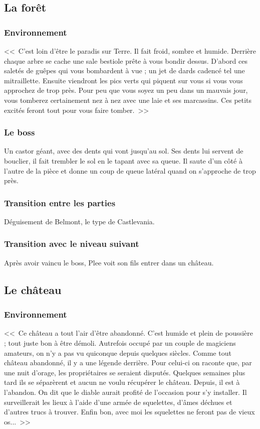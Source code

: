 \documentclass{article}
\begin{document}
\subsection{La forêt}
\subsubsection{Environnement}
<<~C'est loin d'être le paradis sur Terre. Il fait froid, sombre et
humide. Derrière chaque arbre se cache une sale bestiole prête à vous
bondir dessus. D'abord ces saletés de guêpes qui vous bombardent à vue
; un jet de dards cadencé tel une mitraillette. Ensuite viendront les
pics verts qui piquent sur vous si vous vous approchez de trop
près. Pour peu que vous soyez un peu dans un mauvais jour, vous
tomberez certainement nez à nez avec une laie et ses marcassins. Ces
petits excités feront tout pour vous faire tomber.~>>

\subsubsection{Le boss}
Un castor géant, avec des dents qui vont jusqu'au sol. Ses dents lui
servent de bouclier, il fait trembler le sol en le tapant avec sa
queue. Il saute d'un côté à l'autre de la pièce et donne un coup de
queue latéral quand on s'approche de trop près.

\subsubsection{Transition entre les parties}
Déguisement de Belmont, le type de Castlevania.

\subsubsection{Transition avec le niveau suivant}
Après avoir vaincu le boss, Plee voit son fils entrer dans un château.

\subsection{Le ch\^ateau}
\subsubsection{Environnement}
<<~Ce château a tout l'air d'être abandonné. C'est humide et plein de
poussière ; tout juste bon à être démoli. Autrefois occupé par un
couple de magiciens amateurs, on n'y a pas vu quiconque depuis
quelques siècles. Comme tout château abandonné, il y a une légende
derrière. Pour celui-ci on raconte que, par une nuit d'orage, les
propriétaires se seraient disputés. Quelques semaines plus tard ils se
séparèrent et aucun ne voulu récupérer le château. Depuis, il est à
l'abandon. On dit que le diable aurait profité de l'occasion pour s'y
installer. Il surveillerait les lieux à l'aide d'une armée de
squelettes, d'âmes déchues et d'autres trucs à trouver. Enfin bon, avec moi
les squelettes ne feront pas de vieux os...~>>
\end{document}
